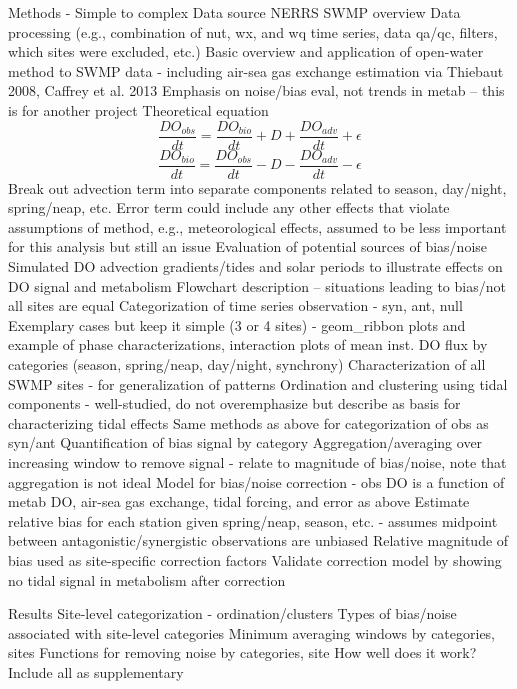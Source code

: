 \documentclass[letterpaper,12pt,oneside]{article}
\begin{document}
\begin{outline}
\1 Methods - Simple to complex
\2 Data source 
\3 NERRS SWMP overview
\3 Data processing (e.g., combination of nut, wx, and wq time series, data qa/qc, filters, which sites were excluded, etc.)
\2 Basic overview and application of open-water method to SWMP data - including air-sea gas exchange estimation via Thiebaut 2008, Caffrey et al. 2013
\2 Emphasis on noise/bias eval, not trends in metab -- this is for another project
\2 Theoretical equation
\begin{equation}
\frac{DO_{obs}}{dt} = \frac{DO_{bio}}{dt} + D + \frac{DO_{adv}}{dt} + \epsilon
\end{equation}
\begin{equation}
\frac{DO_{bio}}{dt} = \frac{DO_{obs}}{dt} - D - \frac{DO_{adv}}{dt} - \epsilon
\end{equation}
\3 Break out advection term into separate components related to season, day/night, spring/neap, etc.
\3 Error term could include any other effects that violate assumptions of method, e.g.,  meteorological effects, assumed to be less important for this analysis but still an issue
\2 Evaluation of potential sources of bias/noise 
\3 Simulated DO advection gradients/tides and solar periods to illustrate effects on DO signal and metabolism
\2 Flowchart description -- situations leading to bias/not all sites are equal
\3 Categorization of time series observation - syn, ant, null 
\3 Exemplary cases but keep it simple (3 or 4 sites) - geom\_ribbon plots and example of phase characterizations, interaction plots of mean inst. DO flux by categories (season, spring/neap, day/night, synchrony)
\2 Characterization of all SWMP sites - for generalization of patterns
\3 Ordination and clustering using tidal components - well-studied, do not overemphasize but describe as basis for characterizing tidal effects
\3 Same methods as above for categorization of obs as syn/ant
\3 Quantification of bias signal by category
\3 Aggregation/averaging over increasing window to remove signal - relate to magnitude of bias/noise, note that aggregation is not ideal
\2 Model for bias/noise correction - obs DO is a function of metab DO, air-sea gas exchange, tidal forcing, and error as above
\3 Estimate relative bias for each station given spring/neap, season, etc. - assumes midpoint between antagonistic/synergistic observations are unbiased
\3 Relative magnitude of bias used as site-specific correction factors
\3 Validate correction model by showing no tidal signal in metabolism after correction


\1 Results
\2 Site-level categorization - ordination/clusters
\2 Types of bias/noise associated with site-level categories
\2 Minimum averaging windows by categories, sites
\2 Functions for removing noise by categories, site 
\3 How well does it work?
\3 Include all as supplementary


\end{outline}
\end{document}
